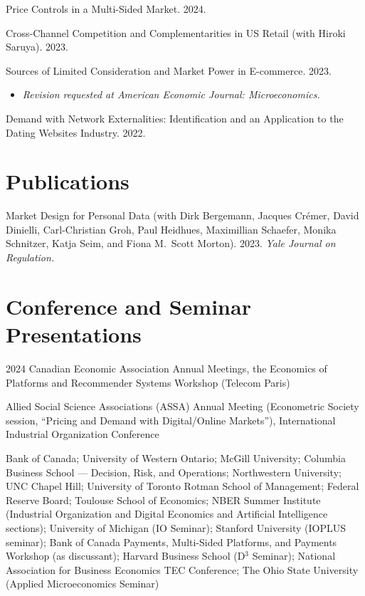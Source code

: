 \documentclass[11pt]{article} %
\begin{document}
Price Controls in a Multi-Sided Market. 2024. 

\medskip

Cross-Channel Competition and Complementarities in US Retail
(with Hiroki Saruya). 2023.

\medskip

Sources of Limited Consideration and Market Power in E-commerce. 2023.
\begin{itemize}
	\item \textit{Revision requested at American Economic Journal: Microeconomics.}
\end{itemize}
\medskip


 
Demand with Network Externalities: 
Identification and an Application to the Dating Websites Industry. 2022.




\section*{Publications}

Market Design for Personal Data
(with Dirk Bergemann, Jacques Cr\'{e}mer, David Dinielli, 
Carl-Christian Groh, Paul Heidhues, Maximillian Schaefer, 
Monika Schnitzer, Katja Seim, and Fiona M.\ Scott Morton).
2023. \textit{Yale Journal on Regulation.}




\section*{Conference and Seminar Presentations}

 2024 Canadian Economic Association Annual Meetings,
		the Economics of Platforms and Recommender Systems Workshop (Telecom Paris)

 Allied Social Science Associations (ASSA) Annual Meeting
	(Econometric Society session, ``Pricing and Demand with Digital/Online Markets''),
	International Industrial Organization Conference
	
 Bank of Canada; University of Western Ontario;
	McGill University; Columbia Business School --- Decision, Risk, and Operations;
	Northwestern University; UNC Chapel Hill; University of Toronto Rotman School
	of Management; Federal Reserve Board; Toulouse School of Economics;
	NBER Summer Institute (Industrial Organization and Digital Economics and Artificial
	Intelligence sections); University of Michigan (IO Seminar);
	Stanford University (IOPLUS seminar); Bank of Canada Payments, Multi-Sided Platforms, and Payments
	Workshop (as discussant); 
	Harvard Business School (D${}^3$ Seminar); 
	National Association for Business Economics TEC Conference;
	The Ohio State University (Applied Microeconomics Seminar)
\end{document}
